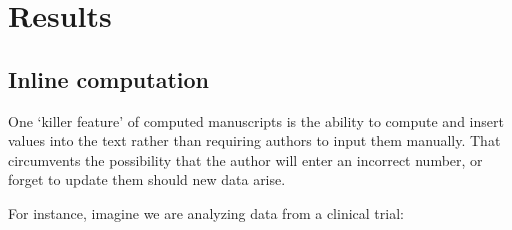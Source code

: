 \documentclass[smallextended]{svjour3}       %
\begin{document}
\hypertarget{results}{%
\section{Results}\label{results}}

\hypertarget{sec:1}{%
\subsection{Inline computation}\label{sec:1}}

One `killer feature' of computed manuscripts is the ability to compute and insert values into the text rather than requiring authors to input them manually. That circumvents the possibility that the author will enter an incorrect number, or forget to update them should new data arise.

For instance, imagine we are analyzing data from a clinical trial:
\end{document}
